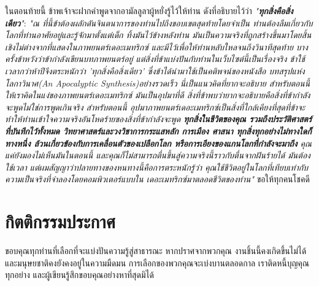 \documentclass[10pt,twocolumn,letterpaper]{article}
\renewcommand{\refname}{เอกสารอ้างอิง}
\begin{document}
ในตอนท้ายนี้ ข้าพเจ้าจะฝากคำพูดจากอามัลลูลาผู้หยั่งรู้ไว้ให้ท่าน ดังที่อธิบายไว้ว่า \textit{"\textbf{ทุกสิ่งคือสิ่งเดียว}"}: \textit{"ณ ที่นี้ข้าต้องผลักดันจินตนาการของท่านไปถึงขอบเขตสุดท้ายโดยจำเป็น ท่านต้องลืมเกี่ยวกับโลกที่ท่านอาศัยอยู่และรู้จักมาตั้งแต่เด็ก ทิ้งมันไว้ข้างหลังท่าน มันเป็นความจริงที่ถูกสร้างขึ้นมาโดยสิ้นเชิงไม่ต่างจากที่แสดงในภาพยนตร์เดอะเมทริกซ์ และมีไว้เพื่อให้ท่านหลับใหลจนถึงวินาทีสุดท้าย บางครั้งข้าหวังว่าข้ากำลังเขียนบทภาพยนตร์อยู่ แต่สิ่งที่ข้าแบ่งปันกับท่านในเว็บไซต์นี้เป็นเรื่องจริง ข้าใช้เวลากว่าห้าปีจึงตระหนักว่า 'ทุกสิ่งคือสิ่งเดียว' ซึ่งข้าได้นำมาใช้เป็นคติพจน์ของหนังสือ บทสรุปแห่งโลกาวินาศ(An Apocalyptic Synthesis)อย่างรวดเร็ว นี่เป็นแนวคิดที่ยากจะอธิบาย สำหรับตอนนี้ ให้เราคิดในแง่ของภาพยนตร์เดอะเมทริกซ์ มันเป็นอุปมาที่ดี สิ่งที่ข้าพบว่ายากจะอธิบายคือสิ่งที่ข้ากำลังจะพูดไม่ใช่การพูดเกินจริง สำหรับตอนนี้ อุปมาภาพยนตร์เดอะเมทริกซ์เป็นสิ่งที่ใกล้เคียงที่สุดที่ข้าจะทำให้ท่านเข้าใจความจริงอันโหดร้ายของสิ่งที่ข้ากำลังจะพูด \textbf{ทุกสิ่งในชีวิตของคุณ รวมถึงประวัติศาสตร์ที่บันทึกไว้ทั้งหมด วิทยาศาสตร์และวงวิชาการกระแสหลัก การเมือง ศาสนา ทุกสิ่งทุกอย่างไม่ทางใดก็ทางหนึ่ง ล้วนเกี่ยวข้องกับการเคลื่อนตัวของเปลือกโลก หรือการเอียงของแกนโลกที่กำลังจะมาถึง} คุณแค่ยังมองไม่เห็นมันในตอนนี้ และคุณก็ไม่สามารถตื่นขึ้นสู่ความจริงนี้ราวกับตื่นจากฝันร้ายได้ มันต้องใช้เวลา แต่ผมสัญญาว่าปลายทางของหนทางนี้คือการตระหนักรู้ว่า คุณใช้ชีวิตอยู่ในโลกที่เทียบเท่ากับความเป็นจริงที่จำลองโดยคอมพิวเตอร์แบบใน เดอะเมทริกซ์มาตลอดชีวิตของท่าน"} \cite{33,34}
ขอให้ทุกคนโชคดี

\section{กิตติกรรมประกาศ}

ขอบคุณทุกท่านที่เลือกที่จะแบ่งปันความรู้สู่สาธารณะ หากปราศจากพวกคุณ งานชิ้นนี้คงเกิดขึ้นไม่ได้ และมนุษยชาติคงยังคงอยู่ในความมืดมน การเลือกของพวกคุณจะเบ่งบานตลอดกาล เราติดหนี้บุญคุณทุกอย่าง และผู้เขียนรู้สึกขอบคุณอย่างหาที่สุดมิได้
\clearpage
\twocolumn

{\small
\renewcommand{\refname}{เอกสารอ้างอิง}


}
\end{document}
